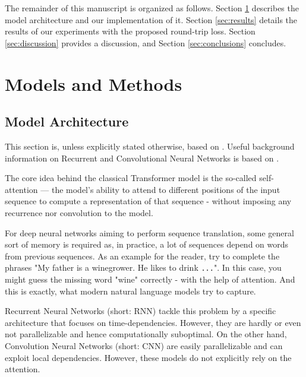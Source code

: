 \documentclass[11pt,a4paper]{article}
\begin{document}
The remainder of this manuscript is organized as follows. Section \ref{sec:models} describes the model architecture and our implementation of it. Section \ref{sec:results} details the results of our experiments with the proposed round-trip loss. Section \ref{sec:discussion} provides a discussion, and Section \ref{sec:conclusions} concludes.

\section{Models and Methods}\label{sec:models}
\subsection{Model Architecture}

This section is, unless explicitly stated otherwise, based on \cite{transformer}. Useful background information on Recurrent and Convolutional Neural Networks is based on \cite{Goodfellow-et-al-2016}.

The core idea behind the classical Transformer model is the so-called self-attention — the model's ability to attend to different positions of the input sequence to compute a representation of that sequence - without imposing any recurrence nor convolution to the model.

For deep neural networks aiming to perform sequence translation, some general sort of memory is required as, in practice, a lot of sequences depend on words from previous sequences. As an example for the reader, try to complete the phrases "My father is a winegrower. He likes to drink {\tt ...}". In this case, you might guess the missing word "wine" correctly - with the help of attention. And this is exactly, what modern natural language models try to capture.

Recurrent Neural Networks (short: RNN) tackle this problem by a specific architecture that focuses on time-dependencies. However, they are hardly or even not parallelizable and hence computationally suboptimal.
On the other hand, Convolution Neural Networks (short: CNN) are easily parallelizable and can exploit local dependencies. However, these models do not explicitly rely on the attention. 
\end{document}
